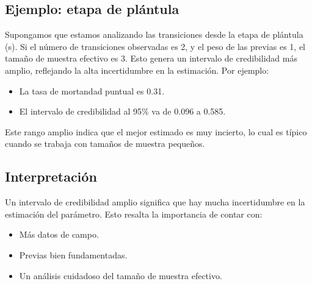 \documentclass[
  12pt,
  letterpaper,
]{book}
\providecommand{\tightlist}{%
  \setlength{\itemsep}{0pt}\setlength{\parskip}{0pt}}\usepackage{longtable,booktabs,array}
\begin{document}
\subsection{Ejemplo: etapa de
plántula}\label{ejemplo-etapa-de-pluxe1ntula}

Supongamos que estamos analizando las transiciones desde la etapa de
plántula (s). Si el número de transiciones observadas es 2, y el peso de
las previas es 1, el tamaño de muestra efectivo es 3. Esto genera un
intervalo de credibilidad más amplio, reflejando la alta incertidumbre
en la estimación. Por ejemplo:

\begin{itemize}
\tightlist
\item
  La tasa de mortandad puntual es 0.31.
\item
  El intervalo de credibilidad al 95\% va de 0.096 a 0.585.
\end{itemize}

Este rango amplio indica que el mejor estimado es muy incierto, lo cual
es típico cuando se trabaja con tamaños de muestra pequeños.

\subsection{Interpretación}\label{interpretaciuxf3n}

Un intervalo de credibilidad amplio significa que hay mucha
incertidumbre en la estimación del parámetro. Esto resalta la
importancia de contar con:

\begin{itemize}
\tightlist
\item
  Más datos de campo.
\item
  Previas bien fundamentadas.
\item
  Un análisis cuidadoso del tamaño de muestra efectivo.
\end{itemize}
\end{document}
